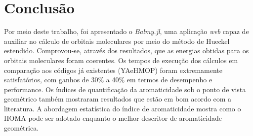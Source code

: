 \chapter{Conclusão}

Por meio deste trabalho, foi apresentado o \textit{Balmy.jl}, uma aplicação \textit{web} capaz de auxiliar no cálculo de orbitais moleculares por meio do método de Hueckel estendido. Comprovou-se, através dos resultados, que as energias obtidas para os orbitais moleculares foram coerentes. Os tempos de execução dos cálculos em comparação aos códigos já existentes (\gls{YAeHMOP}) foram extremamente satisfatórios, com ganhos de 30\% a 40\% em termos de desempenho e performance. Os índices de quantificação da aromaticidade sob o ponto de vista geométrico também mostraram resultados que estão em bom acordo com a literatura. A abordagem estatística do índice de aromaticidade mostra como o \gls{HOMA} pode ser adotado enquanto o melhor descritor de aromaticidade geométrica.